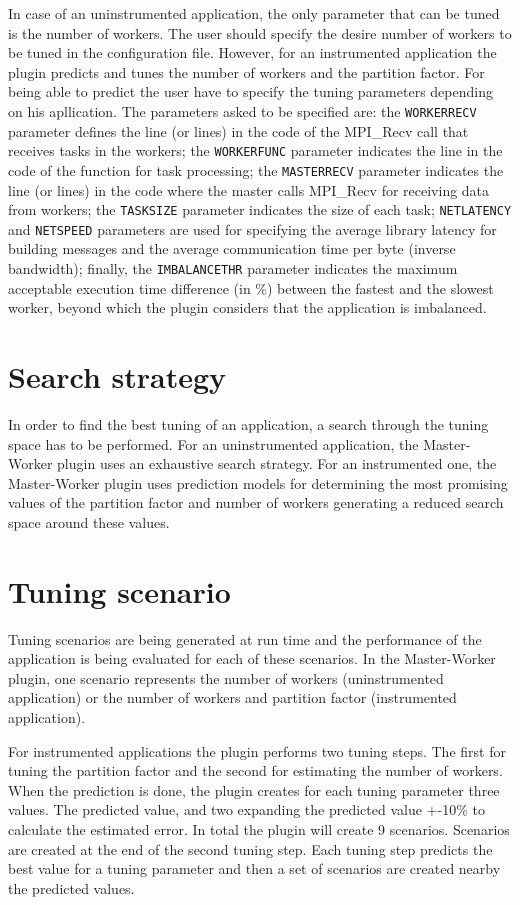 \documentclass[11pt,a4paper, oneside]{book} %
\begin{document}
In case of an uninstrumented application, the only parameter that can be tuned is the number of workers. The user should specify the desire number of workers to be tuned in the configuration file.
However, for an instrumented application the plugin predicts and tunes the number of workers and the partition factor. For being able to predict the user have to specify the tuning parameters depending on his apllication. The parameters asked to be specified are:  the {\tt WORKERRECV} parameter defines the line (or lines) in the code of the MPI\_Recv call that receives tasks in the workers; the {\tt WORKERFUNC} parameter indicates the line in the code of the function for task processing; the {\tt MASTERRECV} parameter indicates the line (or lines) in the code where the master calls MPI\_Recv for receiving data from workers; the {\tt TASKSIZE} parameter indicates the size of each task; {\tt NETLATENCY} and {\tt NETSPEED} parameters are used for specifying the average library latency for building messages and the average communication time per byte (inverse bandwidth); finally, the {\tt IMBALANCETHR} parameter indicates the maximum acceptable execution time difference (in \%) between the fastest and the slowest worker, beyond which the plugin considers that the application is imbalanced.

\section{Search strategy}

In order to find the best tuning of an application, a search through the tuning space has to be performed. For an uninstrumented application, the Master-Worker plugin uses an exhaustive search strategy. For an instrumented one, the Master-Worker plugin uses prediction models for determining the most promising values of the partition factor and number of workers generating a reduced search space around these values.


\section{Tuning scenario}
Tuning scenarios are being generated at run time and the performance of the application is being evaluated for each of these scenarios. In the Master-Worker plugin, one scenario represents the number of workers (uninstrumented application) or the number of workers and partition factor (instrumented application).

For instrumented applications the plugin performs two tuning steps. The first for tuning the partition factor and the second for estimating the number of workers. When the prediction is done, the plugin creates for each tuning parameter three values. The predicted value, and two expanding the predicted value +-10\% to calculate the estimated error. In total the plugin will create 9 scenarios.
Scenarios are created at the end of the second tuning step. Each tuning step predicts the best value for a tuning
parameter and then a set of scenarios are created nearby the predicted values.
\end{document}

